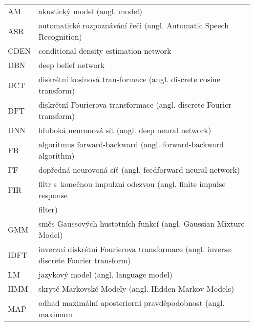 \hspace{1.3cm}
\begin{longtable}{ll}

AM   & akustický model (angl.  model) \\
ASR  & automatické rozpoznávání řeči (angl. Automatic Speech Recognition) \\
CDEN & conditional density estimation network \\
DBN  & deep belief network \\
DCT  & diskrétní kosinová transformace (angl. discrete cosine transform) \\
DFT  & diskrétní Fourierova transformace (angl. discrete Fourier transform) \\
DNN  & hluboká neuronová síť (angl. deep neural network) \\
FB   & algoritmus forward-backward (angl. forward-backward algorithm) \\
FF   & dopředná neurovoná síť (angl. feedforward neural network) \\
FIR  & filtr s~konečnou impulzní odezvou (angl. finite impulse response \\
     & filter) \\
GMM  & směs Gaussových hustotních funkcí (angl. Gaussian Mixture Model) \\
IDFT  & inverzní diskrétní Fourierova transformace (angl. inverse discrete Fourier transform) \\
LM   & jazykový model (angl. language model) \\
HMM  & skryté Markovské Modely (angl. Hidden Markov Models) \\
MAP  & odhad maximální aposteriorní pravděpodobnost (angl. maximum \\

\end{longtable}

